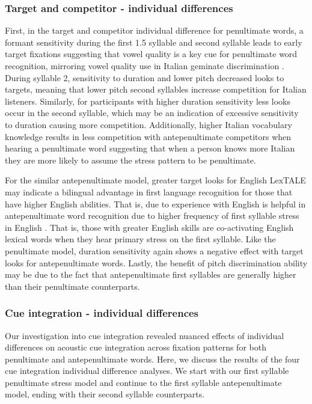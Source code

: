 \subsubsection{Target and competitor - individual differences}
First, in the target and competitor individual difference for penultimate words, a formant sensitivity during the first 1.5 syllable and second syllable leads to early target fixations suggesting that vowel quality is a key cue for penultimate word recognition, mirroring vowel quality use in Italian geminate discrimination \cite{Tsukada_Cox_Hajek_Hirata_2017}. During syllable 2, sensitivity to duration and lower pitch decreased looks to targets, meaning that lower pitch second syllables increase competition for Italian listeners. Similarly, for participants with higher duration sensitivity less looks occur in the second syllable, which may be an indication of excessive sensitivity to duration causing more competition. Additionally, higher Italian vocabulary knowledge results in less competition with antepenultimate competitors when hearing a penultimate word suggesting that when a person knows more Italian they are more likely to assume the stress pattern to be penultimate.



For the similar antepenultimate model, greater target looks for English LexTALE may indicate a bilingual advantage in first language recognition for those that have higher English abilities. That is, due to experience with English is helpful in antepenultimate word recognition due to higher frequency of first syllable stress in English \cite{cutler2007dutch}.  That is, those with greater English skills are co-activating English lexical words when they hear primary stress on the first syllable. Like the penultimate model, duration sensitivity again shows a negative effect with target looks for antepenultimate words. Lastly, the benefit of pitch discrimination ability may be due to the fact that antepenultimate first syllables are generally higher than their penultimate counterparts. 

\subsubsection{Cue integration - individual differences}
Our investigation into cue integration revealed nuanced effects of individual differences on acoustic cue integration across fixation patterns for both penultimate and antepenultimate words. Here, we discuss the results of the four cue integration individual difference analyses. We start with our first syllable penultimate stress model and continue to the first syllable antepenultimate model, ending with their second syllable counterparts.

